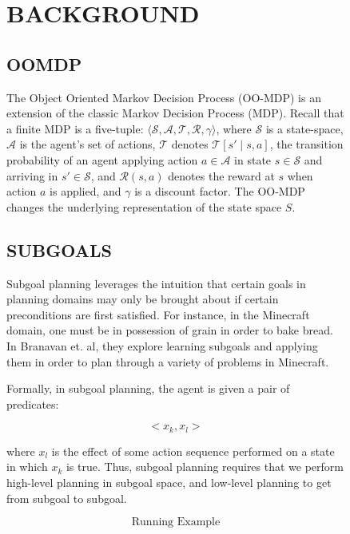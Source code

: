 \documentclass[]{article}
\begin{document}
\begin{figure}

\section{BACKGROUND}

\subsection{OOMDP}

The Object Oriented Markov Decision Process (OO-MDP) is an extension of the classic Markov Decision Process (MDP). Recall that a finite MDP is a five-tuple: $\langle \mathcal{S}, \mathcal{A}, \mathcal{T}, \mathcal{R}, \gamma \rangle$, where $\mathcal{S}$ is a state-space, $\mathcal{A}$ is the agent's set of actions, $\mathcal{T}$ denotes $\mathcal{T}[s' \mid s,a]$, the transition probability of an agent applying action $a \in \mathcal{A}$ in state $s \in \mathcal{S}$ and arriving in $s' \in \mathcal{S}$, and $\mathcal{R}(s,a)$ denotes the reward at $s$ when action $a$ is applied, and $\gamma$ is a discount factor. The OO-MDP changes the underlying representation of the state space $S$.

\subsection{SUBGOALS}
Subgoal planning leverages the intuition that certain goals in planning domains may only be brought about if certain preconditions are first satisfied. For instance, in the Minecraft domain, one must be in possession of grain in order to bake bread. In Branavan et. al, they explore learning subgoals and applying them in order to plan through a variety of problems in Minecraft.

Formally, in subgoal planning, the agent is given a pair of predicates:

\[ 
<x_k, x_l >
\]

where $x_l$ is the effect of some action sequence performed on a state in which $x_k$ is true. Thus, subgoal planning requires that we perform high-level planning in subgoal space, and low-level planning to get from subgoal to subgoal.

\[
\boxed{\text{Running Example}}
\]



\end{figure}
\end{document}
